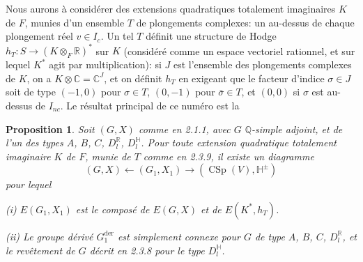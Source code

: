 \documentclass[12pt,a4paper]{article}
\theoremstyle{plain}
\newtheorem{proposition}[theorem]{Proposition}
\theoremstyle{definition}
\theoremstyle{remark}
\DeclareMathOperator{\CSp}{CSp}
\newcommand{\QQ}{\mathbb{Q}}
\newcommand{\RR}{\mathbb{R}}
\newcommand{\CC}{\mathbb{C}}
\newcommand{\HH}{\mathbb{H}}
\begin{document}
\subsubsection{}

Nous aurons \`a consid\'erer des extensions quadratiques totalement imaginaires $K$ de $F$, munies d'un ensemble $T$ de plongements complexes: un au-dessus de chaque plongement r\'eel $v \in I_c$. Un tel $T$ d\'efinit une structure de Hodge $h_T:S \to (K \otimes_F \RR)^*$ sur $K$ (consid\'er\'e comme un espace vectoriel rationnel, et sur lequel $K^*$ agit par multiplication): si $J$ est l'ensemble des plongements complexes de $K$, on a $K \otimes \CC = \CC^J$, et on d\'efinit $h_T$ en exigeant que le facteur d'indice $\sigma \in J$ soit de type $(-1,0)$ pour $\sigma \in T$, $(0,-1)$ pour $\bar{\sigma} \in T$, et $(0,0)$ si $\sigma$ est au-dessus de $I_{nc}$. Le r\'esultat principal de ce num\'ero est la

\begin{proposition}
Soit $(G,X)$ comme en 2.1.1, avec $G$ $\QQ$-simple adjoint, et de l'un des types $A$, $B$, $C$, $D_l^{\RR}$, $D_l^{\mathbb{H}}$. Pour toute extension quadratique totalement imaginaire $K$ de $F$, munie de $T$ comme en 2.3.9, il existe un diagramme
\[
(G,X) \longleftarrow (G_1,X_1) \longrightarrow (\CSp(V),\HH^{\pm})
\]
pour lequel

\textup{(i)} $E(G_1,X_1)$ est le compos\'e de $E(G,X)$ et de $E(K^*,h_T)$.

\textup{(ii)} Le groupe d\'eriv\'e $G_1^{\text{der}}$ est simplement connexe pour $G$ de type $A$, $B$, $C$, $D_l^{\RR}$, et le rev\^etement de $G$ d\'ecrit en 2.3.8 pour le type $D_l^{\mathbb{H}}$.
\end{proposition}
\end{document}
